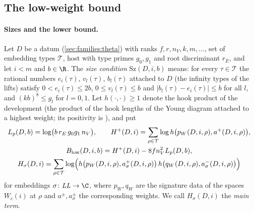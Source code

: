 \subsection{The low-weight bound}\label{sec:pf:onto3:low}

\paragraph{Sizes and the lower bound.}
Let $D$ be a datum (\cref{sec:families:theta}) with ranks $f,r,n_V,k,m,\dots$, set of embedding types
$\mathcal T$, host with type primes $g_0,g_1$ and root discriminant $r_E$, and let $i<m$ and $b\in\R$. The
\emph{size condition} $\mathrm{Sz}(D,i,b)$ means: for every $\tau\in\mathcal T$ the rational numbers $e_i(\tau)$,
$v_l(\tau)$, $b_l(\tau)$ attached to $D$ (the infinity types of the lifts) satisfy $0<e_i(\tau)\le2b$,
$0\le v_l(\tau)\le b$ and $|b_l(\tau)-e_i(\tau)|\le b$ for all $l$, and $(kb)^8\le g_l$ for $l=0,1$. Let $h(\cdot,\cdot)\ge1$
denote the hook product of the development (the product of the hook lengths of the Young diagram attached to a
highest weight; its positivity is ), and put
\begin{gather*}
L_p(D,b)=\log\bigl(b\,r_E\,g_0g_1\,n_V\bigr),\qquad
H^+(D,i)=\sum_{\rho\in\mathcal T}\log h\bigl(p_W(D,i,\rho),a^+(D,i,\rho)\bigr),\\
B_{\mathrm{low}}(D,i,b)=H^+(D,i)-8fn_V^2L_p(D,b),\\
H_\sigma(D,i)=\sum_{\rho\in\mathcal T}\log\Bigl(h\bigl(p_W(D,i,\rho),a^+_\sigma(D,i,\rho)\bigr)\,
h\bigl(q_W(D,i,\rho),a^-_\sigma(D,i,\rho)\bigr)\Bigr)
\end{gather*}
for embeddings $\sigma\colon\mathit{LL}\to\C$, where $p_W,q_W$ are the signature data of the spaces $W_c(i)$ at
$\rho$ and $a^\pm,a^\pm_\sigma$ the corresponding weights. We call $H_\sigma(D,i)$ the \emph{main term}.

